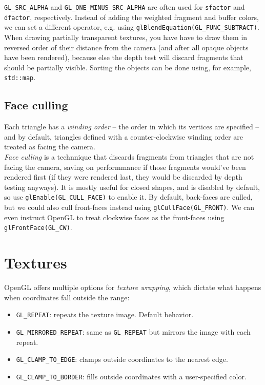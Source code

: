 \documentclass[8pt, table, xcdraw]{article}%
\begin{document}
\lstinline{GL_SRC_ALPHA} and \lstinline{GL_ONE_MINUS_SRC_ALPHA} are often used for \lstinline{sfactor} and \lstinline{dfactor}, respectively. Instead of adding the weighted fragment and buffer colors, we can set a different operator, e.g. using \lstinline{glBlendEquation(GL_FUNC_SUBTRACT)}.\\
When drawing partially transparent textures, you have have to draw them in reversed order of their distance from the camera (and after all opaque objects have been rendered), because else the depth test will discard fragments that should be partially visible. Sorting the objects can be done using, for example, \lstinline{std::map}.

\subsection{Face culling}

Each triangle has a \emph{winding order} -- the order in which its vertices are specified -- and by default, triangles defined with a counter-clockwise winding order are treated as facing the camera.\\
\emph{Face culling} is a technnique that discards fragments from triangles that are not facing the camera, saving on performmance if those fragments would've been rendered first (if they were rendered last, they would be discarded by depth testing anyways). It is mostly useful for closed shapes, and is disabled by default, so use \lstinline{glEnable(GL_CULL_FACE)} to enable it. By default, back-faces are culled, but we could also cull front-faces instead using \lstinline{glCullFace(GL_FRONT)}. We can even instruct OpenGL to treat clockwise faces as the front-faces using \lstinline{glFrontFace(GL_CW)}.

\section{Textures}

OpenGL offers multiple options for \emph{texture wrapping}, which dictate what happens when coordinates fall outside the range:

\begin{itemize}
    \item \lstinline{GL_REPEAT}: repeats the texture image. Default behavior.
    \item \lstinline{GL_MIRRORED_REPEAT}: same as \lstinline{GL_REPEAT} but mirrors the image with each repeat.
    \item \lstinline{GL_CLAMP_TO_EDGE}: clamps outside coordinates to the nearest edge.
    \item \lstinline{GL_CLAMP_TO_BORDER}: fills outside coordinates with a user-specified color.
\end{itemize}
\end{document}

